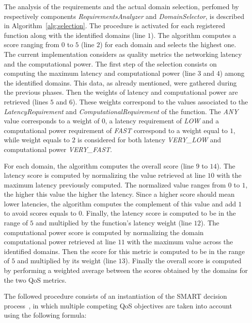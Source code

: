 The analysis of the requirements and the actual domain selection, perfomed by respectively components  \textit{RequirementsAnalyzer} and \textit{DomainSelector}, is described in Algorithm~\ref{alg:selection}. The procedure is activated for each registered function along with the identified domains (line $1$). The algorithm computes a score ranging from $0$ to $5$ (line $2$) for each domain and selects the highest one. The current implementation considers as quality metrics the networking latency and the computational power. The first step of the selection consists on computing the maximum latency and computational power (line $3$ and $4$) among the identified domains. This data, as already mentioned, were gathered during the previous phases. Then the weights of latency and computational power are retrieved (lines $5$ and $6$). These weights correspond to the values associated to the \textit{LatencyRequirement} and \textit{ComputationalRequirement} of the function. The \textit{ANY} value corresponds to a weight of $0$, a latency requirement of \textit{LOW} and a computational power requirement of \textit{FAST} correspond to a weight equal to $1$, while weight equals to $2$ is considered for both latency \textit{VERY\_LOW} and computational power \textit{VERY\_FAST}.

For each domain, the algorithm computes the overall score (line  $9$ to $14$). The latency score is computed by normalizing the value retrieved at line $10$ with the maximum latency previously computed. The normalized value ranges from $0$ to $1$, the higher this value the higher the latency. Since a higher score should mean lower latencies, the algorithm computes the complement of this value and add $1$ to avoid scores equals to $0$. Finally, the latency score is computed to be in the range of $5$ and multiplied by the function's latency weight (line $12$). The computational power score is computed by normalizing the domain computational power retrieved at line $11$ with the  maximum value across the identified domains. Then the score for this metric is computed to be in the range of $5$ and multiplied by its weight (line $13$). Finally the overall score is computed by performing a weighted average between the scores obtained by the domains for the two QoS metrics.

The followed procedure consists of an instantiation of the SMART decision process~\cite{Olson1996}, in which multiple competing QoS objectives are taken into account using the following formula:

